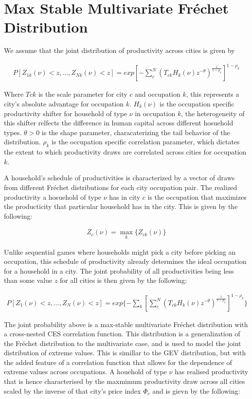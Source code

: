 \documentclass[10pt]{article}
\begin{document}
\section{Max Stable Multivariate Fréchet Distribution}

We assume that the joint distribution of productivity across cities is given by

\begin{align}
    P[Z_{1k}(\nu) < z, \dots, Z_{Nk} (\nu) < z] = exp[-\sum_{c}^{N}(T_{ck} H_k(\nu) z^{-\theta})^{\frac{1}{1 - \rho_k}}]^{1 - \rho_k}
\end{align}

Where $T{ck}$ is the scale parameter for city $c$ and occupation $k$, this represents a city's absolute advantage for occupation $k$. $H_k(\nu)$ is the occupation specific productivity shifter for household of type $\nu$ in occupation $k$, the heterogeneity of this shifter relfects the difference in human capital across different hosuehold types. $\theta > 0$ is the shape parameter, characaterizing the tail behavior of the distribution. $\rho_k$ is the occupation specific correlation parameter, which dictates the extent to which productivity draws are correlated across cities for occupation $k$.

A household's schedule of productivities is characterized by a vector of draws from different Fréchet distributions for each city occupation pair. The realized productivity a hosuehold of type $\nu$ has in city $c$ is the occupation that maximizes the producticity that particular household has in the city. This is given by the following:

\begin{align}
    Z_c(\nu) = \max_{k} \{Z_{ck}(\nu)\}
\end{align}

Unlike sequential games where households might pick a city before picking an occupation, this schedule of productivity already determines the ideal occupation for a household in a city. The joint probability of all productivities being less than some value $z$ for all cities is then given by the following:

\begin{align}
    P[Z_1(\nu) < z, \dots, Z_N(\nu) < z] = exp\{- \sum_{k}^{}[\sum_{c}^{N}(T_{ck} H_k(\nu) z^{-\theta})^{\frac{1}{1 - \rho_k}}]^{1 - \rho_k}\}
\end{align}

The joint probability above is a max-stable multivariate Fréchet distribution with a cross-nested CES correlation function. This distribution is a generalization of the Fréchet distribution to the multivariate case, and is used to model the joint distribution of extreme values. This is simillar to the GEV distribution, but with the added feature of a correlation function that allows for the dependence of extreme values across occupations. A houehold of type $\nu$ has realised productivity that is hence characterised by the maxmimum productivity draw across all cities scaled by the inverse of that city's price index $\Phi_c$ and is gievn by the following:
\end{document}
